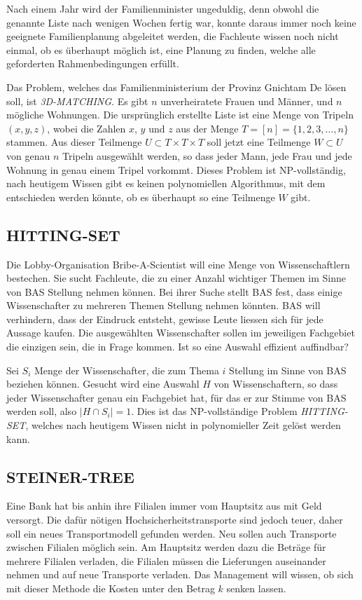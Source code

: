 Nach einem Jahr wird der Familienminister ungeduldig, denn obwohl die
genannte Liste nach wenigen Wochen fertig war, konnte daraus immer noch
keine geeignete Familienplanung abgeleitet werden, die Fachleute wissen
noch nicht einmal, ob es überhaupt möglich ist, eine Planung
zu finden, welche alle geforderten Rahmenbedingungen erfüllt.

\medskip

Das Problem, welches das Familienministerium der Provinz Gnichtam De
lösen soll, ist {\it 3D-MATCHING}.
Es gibt $n$ unverheiratete Frauen
und Männer, und $n$ mögliche Wohnungen.
Die ursprünglich erstellte
Liste ist eine Menge von Tripeln $(x,y,z)$, wobei die Zahlen $x$,
$y$ und $z$ aus der Menge $T=[n]=\{1,2,3,\dots,n\}$ stammen.
Aus dieser
Teilmenge $U\subset T\times T\times T$ soll jetzt eine 
Teilmenge $W\subset U$ von genau $n$ Tripeln ausgewählt werden, so dass
jeder Mann, jede Frau und jede Wohnung in genau einem Tripel vorkommt.
Dieses Problem ist NP-vollständig, 
nach heutigem Wissen gibt es keinen polynomiellen Algorithmus,
mit dem entschieden werden könnte, ob es überhaupt so eine Teilmenge
$W$ gibt.

\subsection{HITTING-SET}
Die Lobby-Organisation Bribe-A-Scientist will eine Menge von
Wissenschaftlern bestechen.
Sie sucht Fachleute, die zu einer Anzahl wichtiger Themen
im Sinne von BAS Stellung nehmen können.
Bei ihrer Suche stellt BAS fest, dass einige Wissenschafter
zu mehreren Themen Stellung nehmen könnten.
BAS will verhindern, dass der Eindruck entsteht, gewisse
Leute liessen sich für jede Aussage kaufen.
Die ausgewählten Wissenschafter sollen im jeweiligen Fachgebiet
die einzigen sein, die in Frage kommen.
Ist so eine Auswahl effizient auffindbar?

\medskip

Sei $S_i$ Menge der Wissenschafter, die zum Thema $i$ Stellung im
Sinne von BAS beziehen können.
Gesucht wird eine Auswahl
$H$ von Wissenschaftern, so dass jeder Wissenschafter genau
ein Fachgebiet hat, für das er zur Stimme von BAS werden soll,
also $|H\cap S_i|=1$.
Dies ist das NP-vollständige Problem {\it HITTING-SET}, welches
nach heutigem Wissen nicht in polynomieller Zeit gelöst werden
kann.


\subsection{STEINER-TREE}
Eine Bank hat bis anhin ihre Filialen immer vom Hauptsitz aus mit
Geld versorgt.
Die dafür nötigen Hochsicherheitstransporte sind
jedoch teuer, daher soll ein neues Transportmodell gefunden werden.
Neu sollen auch Transporte zwischen Filialen möglich sein.
Am Hauptsitz werden dazu die Beträge für mehrere Filialen
verladen, die Filialen müssen die Lieferungen
auseinander nehmen und auf neue Transporte verladen.
Das Management will wissen, ob sich mit dieser Methode die
Kosten unter den Betrag $k$ senken lassen.

